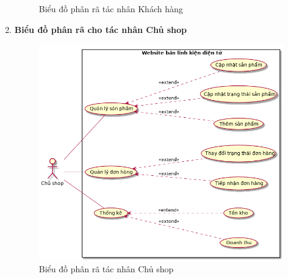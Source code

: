 \begin{enumerate}[label=\textbf{\alph*)}]
\begin{figure}[h!]
		      \caption{Biểu đồ phân rã tác nhân Khách hàng}
	      \end{figure}
	      \newpage
	\item \textbf{Biểu đồ phân rã cho tác nhân Chủ shop}
	      \begin{figure}[h!]
		      \centering
		      \includegraphics[scale=0.6]{fig/uc_admin.png}
		      \caption{Biểu đồ phân rã tác nhân Chủ shop}
	      \end{figure}
\end{enumerate}
